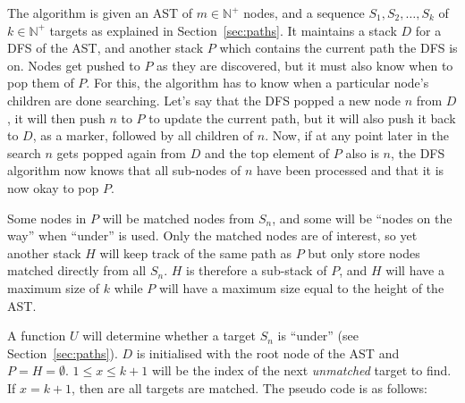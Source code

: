 \documentclass[a4paper,12pt]{article}
\newcommand{\elnaturale}{\mathbb{N}}
\begin{document}
The algorithm is given an
AST of $m \in \elnaturale^+$ nodes, and a sequence $S_1, S_2, \dots, S_k$ of $k \in \elnaturale^+$ targets as
explained in Section~\ref{sec:paths}. It maintains a stack $D$ for a DFS of the
AST, and another stack $P$ which contains the current path the DFS is on. Nodes get pushed
to $P$ as they are discovered, but it must also know when to pop them of $P$. For this,
the algorithm
has to know when a particular node's children are done searching. Let's say that the DFS
popped a new node $n$ from $D$, it will then push $n$ to $P$ to update the current path, but it will
also push it back to $D$, as a marker, followed by all children of $n$. Now, if at any point later in
the search $n$ gets popped again from $D$ and the top element of $P$ also is $n$, the DFS
algorithm now knows that all sub-nodes of $n$ have been processed and that it is now okay to pop $P$.

Some nodes in $P$ will be matched nodes from $S_n$, and some will be ``nodes on the way''
when ``under'' is used. Only the matched nodes are of interest, so yet another stack $H$
will keep track of the same path as $P$ but only store nodes matched directly from all $S_n$.
$H$ is therefore a sub-stack of $P$, and
$H$ will have a maximum size of $k$ while $P$ will have a maximum size equal to
the height of the AST.

A function $U$
will determine whether a target $S_n$ is ``under'' (see Section~\ref{sec:paths}). $D$ is
initialised with the root node of the AST and $P = H = \emptyset$. $1 \leq x \leq k+1$ will be the index of
the next \emph{unmatched} target to find. If $x = k+1$, then are all targets are matched.
The pseudo code is as follows:
\end{document}
